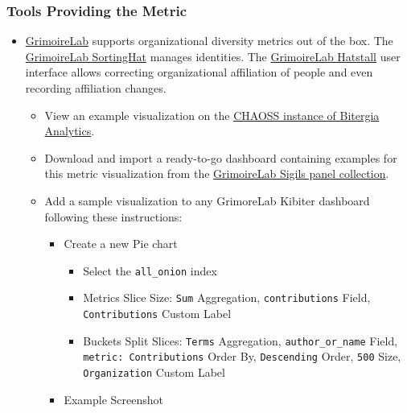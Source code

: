 \hypertarget{tools-providing-the-metric}{%
\subsubsection{Tools Providing the
Metric}\label{tools-providing-the-metric}}

\begin{itemize}
\tightlist
\item
  \href{https://chaoss.github.io/grimoirelab}{GrimoireLab} supports
  organizational diversity metrics out of the box. The
  \href{https://github.com/chaoss/grimoirelab-sortinghat}{GrimoireLab
  SortingHat} manages identities. The
  \href{https://github.com/chaoss/grimoirelab-hatstall}{GrimoireLab
  Hatstall} user interface allows correcting organizational affiliation
  of people and even recording affiliation changes.

  \begin{itemize}
  \tightlist
  \item
    View an example visualization on the
    \href{https://chaoss.biterg.io/app/kibana\#/dashboard/Community-Structure-by-Organization}{CHAOSS
    instance of Bitergia Analytics}.
  \item
    Download and import a ready-to-go dashboard containing examples for
    this metric visualization from the
    \href{https://chaoss.github.io/grimoirelab-sigils/panels/community-structure-by-organization/}{GrimoireLab
    Sigils panel collection}.
  \item
    Add a sample visualization to any GrimoreLab Kibiter dashboard
    following these instructions:

    \begin{itemize}
    \tightlist
    \item
      Create a new Pie chart

      \begin{itemize}
      \tightlist
      \item
        Select the \texttt{all\_onion} index
      \item
        Metrics Slice Size: \texttt{Sum} Aggregation,
        \texttt{contributions} Field, \texttt{Contributions} Custom
        Label
      \item
        Buckets Split Slices: \texttt{Terms} Aggregation,
        \texttt{author\_or\_name} Field, \texttt{metric:\ Contributions}
        Order By, \texttt{Descending} Order, \texttt{500} Size,
        \texttt{Organization} Custom Label
      \end{itemize}
    \item
      Example Screenshot
    \end{itemize}


\end{itemize}
\end{itemize}
